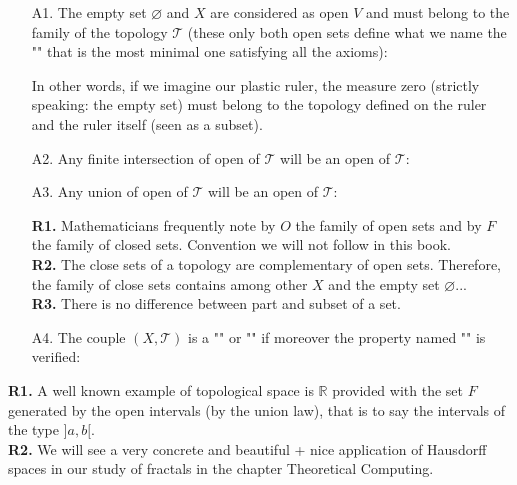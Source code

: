 	\begin{enumerate}
		\item[A1.] The empty set $\varnothing$ and $X$ are considered as open $V$ and must belong to the family of the topology $\mathcal{T}$ (these only both open sets define what we name the "" that is the most minimal one satisfying all the axioms):
		
		In other words, if we imagine our plastic ruler, the measure zero (strictly speaking: the empty set) must belong to the topology defined on the ruler and the ruler itself (seen as a subset).
		
		\item[A2.] Any finite intersection of open of $\mathcal{T}$ will be an open of $\mathcal{T}$:
		
		
		\item[A3.] Any union of open of $\mathcal{T}$ will be an open of $\mathcal{T}$:
		
		\begin{tcolorbox}[title=Remarks,arc=10pt,breakable,drop lifted shadow,
  skin=enhanced,
  skin first is subskin of={enhancedfirst}{arc=10pt,no shadow},
  skin middle is subskin of={enhancedmiddle}{arc=10pt,no shadow},
  skin last is subskin of={enhancedlast}{drop lifted shadow}]
		\textbf{R1.} Mathematicians frequently note by $O$ the family of open sets and by $F$ the family of closed sets. Convention we will not follow in this book.\\

		\textbf{R2.} The close sets of a topology are complementary of open sets. Therefore, the family of close sets contains among other $X$ and the empty set $\varnothing$...\\
	
		\textbf{R3.} There is no difference between part and subset of a set.
		\end{tcolorbox}
		
		\item[A4.] The couple $(X,\mathcal{T})$ is a "" or "" if moreover the property named "" is verified:
				
	\end{enumerate}
	\begin{tcolorbox}[title=Remarks,arc=10pt,breakable,drop lifted shadow,
  skin=enhanced,
  skin first is subskin of={enhancedfirst}{arc=10pt,no shadow},
  skin middle is subskin of={enhancedmiddle}{arc=10pt,no shadow},
  skin last is subskin of={enhancedlast}{drop lifted shadow}]
		\textbf{R1.} A well known example of topological space is $\mathbb{R}$ provided with the set $F$ generated by the open intervals (by the union law), that is to say the intervals of the type $] a, b [$.\\
		
		\textbf{R2.} We will see a very concrete and beautiful + nice application of Hausdorff spaces in our study of fractals in the chapter Theoretical Computing.
	\end{tcolorbox}
	
